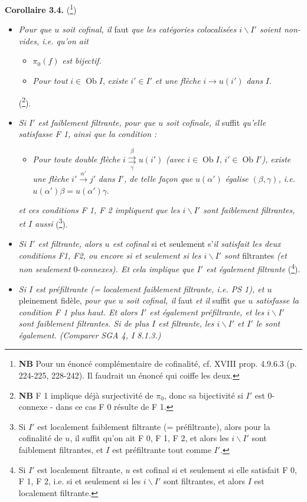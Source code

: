 \documentclass[11pt]{article}
\newcommand{\printedpage}[1]{\marginpar{\footnotesize p.~#1}}
\def\dcprintedpending{}
\newcommand{\msp}[1]{\marginpar{\footnotesize\raggedright
  \ifx\dcprintedpending\empty\else p.~\dcprintedpending\par\fi
  [#1]}\gdef\dcprintedpending{}}
\newcommand{\Ob}{\operatorname{Ob}}
\newcommand{\bs}{\backslash}
\newcommand{\dbl}[2]{\mathrel{\overset{#1}{\underset{#2}{\rightrightarrows}}}}
\begin{document}
\noindent\textbf{Corollaire 3.4.} (\footnote[55]{\textbf{NB} Pour un énoncé complémentaire de cofinalité, cf. XVIII prop. 4.9.6.3 (p. 224-225, 228-242). Il faudrait un énoncé qui coiffe les deux.})
\begin{itemize}[label={}]
\item[\textit{a)}] \textit{Pour que $u$ soit cofinal, il} faut \textit{que les catégories colocalisées $i\bs I'$ soient non-vides, i.e. qu'on ait}

\msp{page 46}
\begin{itemize}[label={}]
\item[\textit{F 0)}] $\pi_0(f)$ \textit{est bijectif.}
\item[\textit{F 1)}] \textit{Pour tout} $i \in \Ob I$, \textit{existe} $i' \in I'$ \textit{et une flèche} $i \longrightarrow u(i')$ \textit{dans} $I$.
\end{itemize}
(\footnote[56]{\textbf{NB} F 1 implique déjà surjectivité de $\pi_0$, donc sa bijectivité si $I'$ est 0-connexe - dans ce cas F 0 résulte de F 1.}).
\item[\textit{b)}] \textit{Si $I'$ est faiblement filtrante, pour que $u$ soit cofinale, il} suffit \textit{qu'elle satisfasse F 1, ainsi que la condition :}
\begin{itemize}[label={}]
\item[\textit{F 2)}] \textit{Pour toute double flèche} $i \dbl{\beta}{\gamma} u(i')$ \textit{(avec} $i \in \Ob I$, $i' \in \Ob I'$\textit{),} \textit{existe une flèche} $i' \xrightarrow{\alpha'} j'$ \textit{dans} $I'$\textit{, de telle façon que} $u(\alpha')$ \textit{égalise} $(\beta, \gamma)$\textit{, i.e.} $u(\alpha')\beta = u(\alpha')\gamma$.
\end{itemize}
\textit{et ces conditions F 1, F 2 impliquent que les $i\bs I'$ sont faiblement filtrantes, et $I$ aussi} (\footnote[57]{Si $I'$ est localement faiblement filtrante (= préfiltrante), alors pour la cofinalité de $u$, il suffit qu'on ait F 0, F 1, F 2, et alors les $i\bs I'$ sont faiblement filtrantes, et $I$ est préfiltrante tout comme $I'$.}).

\printedpage{30}
\item[\textit{c)}] \textit{Si $I'$ est filtrante, alors $u$ est cofinal} si et seulement s'\textit{il satisfait les deux conditions F1, F2, ou encore si et seulement si les $i\bs I'$ sont} filtrantes \textit{(et non seulement} 0-\textit{connexes). Et cela implique que $I'$ est également filtrante} (\footnote[58]{Si $I'$ est localement filtrante, $u$ est cofinal si et seulement si elle satisfait F 0, F 1, F 2, i.e. si et seulement si les $i\bs I'$ sont filtrantes, et alors $I$ est localement filtrante.}).
\item[\textit{d)}] \textit{Si $I$ est préfiltrante (= localement faiblement filtrante, i.e. PS 1), et $u$} pleinement fidèle, \textit{pour que $u$ soit cofinal, il} faut \textit{et il} suffit \textit{que $u$ satisfasse la condition F 1 plus haut. Et alors $I'$ est également préfiltrante, et les $i\bs I'$ sont faiblement filtrantes. Si de plus $I$ est filtrante, les $i\bs I'$ et $I'$ le sont également. (Comparer SGA 4, I 8.1.3.)}
\end{itemize}
\end{document}
